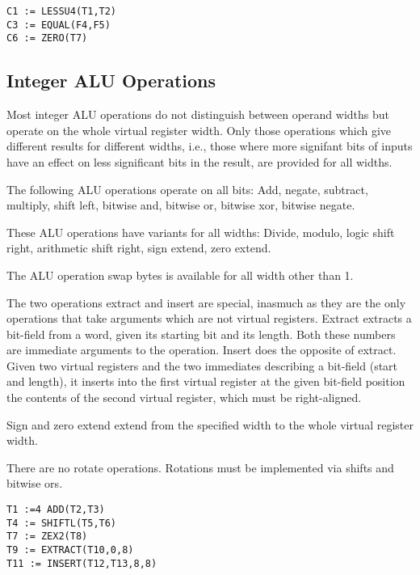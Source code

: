 \documentclass{article}
\begin{document}
\begin{verbatim}
C1 := LESSU4(T1,T2)
C3 := EQUAL(F4,F5)
C6 := ZERO(T7)
\end{verbatim}

\subsection{Integer ALU Operations}

Most integer ALU operations do not distinguish between operand widths
but operate on the whole virtual register width.  Only those
operations which give different results for different widths, i.e.,
those where more signifant bits of inputs have an effect on less
significant bits in the result, are provided for all widths.

The following ALU operations operate on all bits: Add, negate,
subtract, multiply, shift left, bitwise and, bitwise or, bitwise xor,
bitwise negate.

These ALU operations have variants for all widths: Divide, modulo,
logic shift right, arithmetic shift right, sign extend, zero extend.

The ALU operation swap bytes is available for all width other than 1.

The two operations extract and insert are special, inasmuch as they
are the only operations that take arguments which are not virtual
registers.  Extract extracts a bit-field from a word, given its
starting bit and its length.  Both these numbers are immediate
arguments to the operation.
Insert does the opposite of extract.  Given two virtual registers and
the two immediates describing a bit-field (start and length), it
inserts into the first virtual register at the given bit-field
position the contents of the second virtual register, which must be
right-aligned.

Sign and zero extend extend from the specified width to the whole
virtual register width.  

There are no rotate operations.  Rotations must be implemented via
shifts and bitwise ors.

\begin{verbatim}
T1 :=4 ADD(T2,T3)
T4 := SHIFTL(T5,T6)
T7 := ZEX2(T8)
T9 := EXTRACT(T10,0,8)
T11 := INSERT(T12,T13,8,8)
\end{verbatim}
\end{document}
